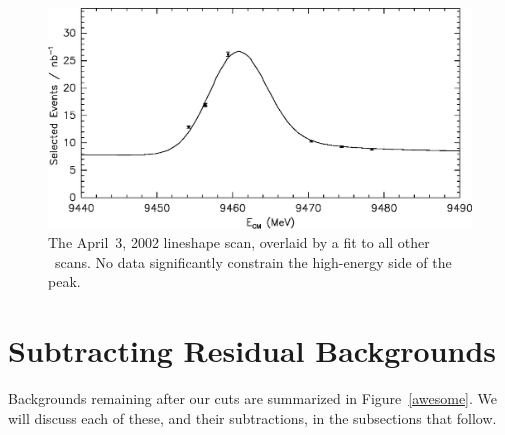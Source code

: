 \documentclass{cornell}
\begin{document}
\begin{figure}[t]
  \begin{center}
    \includegraphics[width=0.8\linewidth]{apr03scan}
  \end{center}
  \caption[The rejected April 3, 2002 scan]{\label{apr03scan} The
  April~3, 2002 lineshape scan, overlaid by a fit to all other \us\
  scans.  No data significantly constrain the high-energy side of the
  peak.}
\end{figure}

\section{Subtracting Residual Backgrounds}

Backgrounds remaining after our cuts are summarized in Figure~\ref{awesome}.  We will discuss each of these, and their subtractions,
in the subsections that follow.
\end{document}
